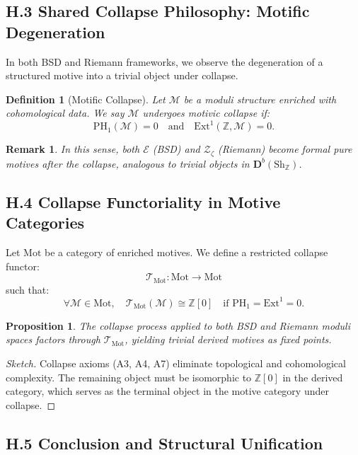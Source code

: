 \documentclass[11pt]{article}
\newtheorem{definition}[theorem]{Definition}
\newtheorem{proposition}[theorem]{Proposition}
\newtheorem{remark}[theorem]{Remark}
\begin{document}
\subsection*{H.3 Shared Collapse Philosophy: Motific Degeneration}

In both BSD and Riemann frameworks, we observe the degeneration of a structured motive into a trivial object under collapse.

\begin{definition}[Motific Collapse]
Let $\mathcal{M}$ be a moduli structure enriched with cohomological data.  
We say $\mathcal{M}$ undergoes motivic collapse if:
\[
\mathrm{PH}_1(\mathcal{M}) = 0 \quad \text{and} \quad \mathrm{Ext}^1(\mathbb{Z}, \mathcal{M}) = 0.
\]
\end{definition}

\begin{remark}
In this sense, both $\mathcal{E}$ (BSD) and $\mathcal{Z}_\zeta$ (Riemann) become formal pure motives  
after the collapse, analogous to trivial objects in $\mathbf{D}^b(\text{Sh}_\mathbb{Z})$.
\end{remark}

\subsection*{H.4 Collapse Functoriality in Motive Categories}

Let $\mathrm{Mot}$ be a category of enriched motives.  
We define a restricted collapse functor:
\[
\mathcal{T}_{\mathrm{Mot}} : \mathrm{Mot} \to \mathrm{Mot}
\]
such that:
\[
\forall \mathcal{M} \in \mathrm{Mot},\quad \mathcal{T}_{\mathrm{Mot}}(\mathcal{M}) \cong \mathbb{Z}[0] \quad \text{if } \mathrm{PH}_1 = \mathrm{Ext}^1 = 0.
\]

\begin{proposition}
The collapse process applied to both BSD and Riemann moduli spaces factors through $\mathcal{T}_{\mathrm{Mot}}$,  
yielding trivial derived motives as fixed points.
\end{proposition}

\begin{proof}[Sketch]
Collapse axioms (A3, A4, A7) eliminate topological and cohomological complexity.  
The remaining object must be isomorphic to $\mathbb{Z}[0]$ in the derived category,  
which serves as the terminal object in the motive category under collapse.
\end{proof}

\subsection*{H.5 Conclusion and Structural Unification}
\end{document}
